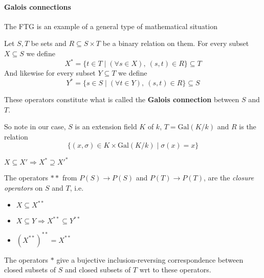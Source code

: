 
\usepackage{thmtools}
\usepackage{makeidx}
\makeindex


\newcommand{\Gal}[1]{\text{Gal}(#1)}
\newcommand{\Bergman}[1]{\textcolor{LimeGreen}{\textit{#1}}}



  
  \paragraph*{Galois connections}

  \begin{bergman}
    The FTG is an example of a general type of mathematical situation
    \begin{definition}
      Let $S,T$ be sets and $R\subseteq S\times T$ be a binary relation on them. For every subset $X\subseteq S$ we define \[
        X^\ast = \{t\in T\mid (\forall s\in X), \ (s,t)\in R\}\subseteq T  
      \]
      And likewise for every subset $Y\subseteq T$ we define\[
        Y^\ast = \{s\in S\mid (\forall t\in Y), \ (s,t)\in R\}\subseteq S  
      \] 

      These operators constitute what is called the \textbf{Galois connection} between $S$ and $T$.
    \end{definition}
    So note in our case, $S$ is an extension field $K$ of $k$, $T = \Gal{K/k}$ and $R$ is the relation \[\{(x,\sigma)\in K\times \Gal{K/k}\mid \sigma(x) = x \}\]
  
  \begin{Properties}
    \item $X\subseteq X' \Rightarrow X^\ast \supseteq X'^\ast$
    \item The operators $\ast\ast$ from $P(S)\rightarrow P(S)$ and  $P(T)\rightarrow P(T)$, are the \textit{closure operators} on $S$ and $T$, i.e.\begin{itemize}
      \item $X\subseteq X^{\ast\ast}$
      \item $X\subseteq Y\Rightarrow X^{\ast\ast}\subseteq Y^{\ast\ast}$
      \item ${(X^{\ast\ast})}^{\ast\ast} = X^{\ast\ast}$
    \end{itemize}
    \item The operators $\ast$ give a bujective inclusion-reversing correspondence between closed subsets of $S$ and closed subsets of $T$ wrt to these operators.
  \end{Properties}
  \end{bergman}

